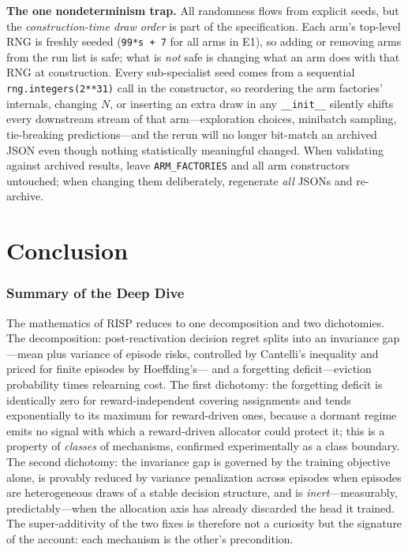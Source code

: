 \documentclass[11pt,a4paper]{article}
\theoremstyle{definition}
\theoremstyle{plain}
\newcommand{\nm}{\textsc{RISP}}
\begin{document}
\begin{warning}
\textbf{The one nondeterminism trap.} All randomness flows from explicit
seeds, but the \emph{construction-time draw order} is part of the
specification. Each arm's top-level RNG is freshly seeded
(\texttt{99*s + 7} for all arms in E1), so adding or removing arms from the
run list is safe; what is \emph{not} safe is changing what an arm does with
that RNG at construction. Every sub-specialist seed comes from a sequential
\texttt{rng.integers(2**31)} call in the constructor, so reordering the arm
factories' internals, changing $N$, or inserting an extra draw in any
\texttt{\_\_init\_\_} silently shifts every downstream stream of that
arm---exploration choices, minibatch sampling, tie-breaking
predictions---and the rerun will no longer bit-match an archived JSON even
though nothing statistically meaningful changed. When validating against
archived results, leave \texttt{ARM\_FACTORIES} and all arm constructors
untouched; when changing them deliberately, regenerate \emph{all} JSONs and
re-archive.
\end{warning}

\part{Conclusion}

\section*{Summary of the Deep Dive}

The mathematics of \nm{} reduces to one decomposition and two
dichotomies. The decomposition: post-reactivation decision regret splits
into an invariance gap---mean plus variance of episode risks, controlled
by Cantelli's inequality and priced for finite episodes by Hoeffding's---
and a forgetting deficit---eviction probability times relearning cost.
The first dichotomy: the forgetting deficit is identically zero for
reward-independent covering assignments and tends exponentially to its
maximum for reward-driven ones, because a dormant regime emits no signal
with which a reward-driven allocator could protect it; this is a property
of \emph{classes} of mechanisms, confirmed experimentally as a class
boundary. The second dichotomy: the invariance gap is governed by the
training objective alone, is provably reduced by variance penalization
across episodes when episodes are heterogeneous draws of a stable
decision structure, and is \emph{inert}---measurably, predictably---when
the allocation axis has already discarded the head it trained. The
super-additivity of the two fixes is therefore not a curiosity but the
signature of the account: each mechanism is the other's precondition.
\end{document}
